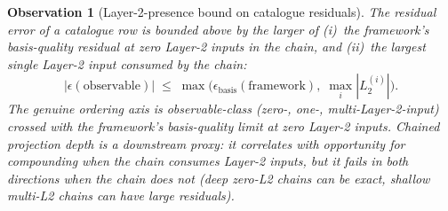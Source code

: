 \documentclass[11pt]{article}
\newtheorem{observation}{Observation}
\begin{document}
\begin{observation}[Layer-2-presence bound on catalogue residuals]
\label{pred:l2_presence}
The residual error of a catalogue row is bounded above by the
larger of (i)~the framework's basis-quality residual at zero
Layer-2 inputs in the chain, and (ii)~the largest single Layer-2
input consumed by the chain:
\begin{equation*}
|\epsilon(\text{observable})| \;\leq\;
\max\!\bigl(\epsilon_\text{basis}(\text{framework}),
\;\max_i |L_2^{(i)}|\bigr).
\end{equation*}
The genuine ordering axis is observable-class (zero-, one-,
multi-Layer-2-input) crossed with the framework's basis-quality
limit at zero Layer-2 inputs.  Chained projection depth is a
downstream proxy: it correlates with opportunity for compounding
when the chain consumes Layer-2 inputs, but it fails in both
directions when the chain does not (deep zero-L2 chains can be
exact, shallow multi-L2 chains can have large residuals).
\end{observation}
\end{document}
